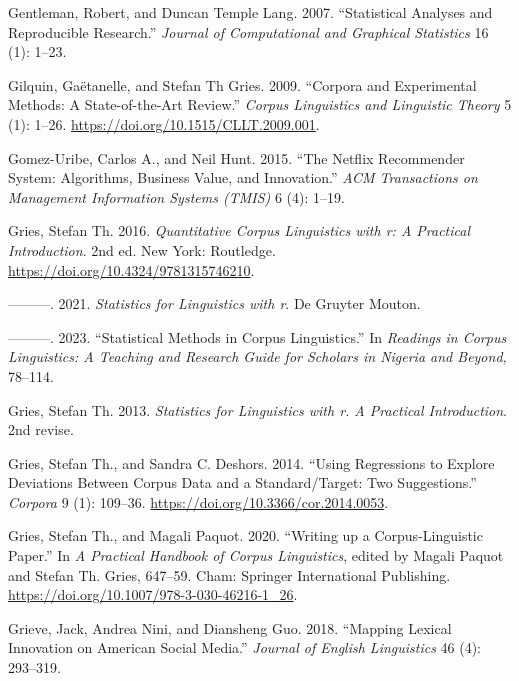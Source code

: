 \documentclass[
  letterpaper,
]{latex/krantz}
\newlength{\cslhangindent}
\newenvironment{CSLReferences}[2] %
 {\begin{list}{}{%
  \setlength{\itemindent}{0pt}
  \setlength{\leftmargin}{0pt}
  \setlength{\parsep}{0pt}
  \ifodd #1
   \setlength{\leftmargin}{\cslhangindent}
   \setlength{\itemindent}{-1\cslhangindent}
  \fi
  \setlength{\itemsep}{#2\baselineskip}}}
 {\end{list}}
\theoremstyle{definition}
\theoremstyle{remark}
\begin{document}
\begin{CSLReferences}{1}{0}
Gentleman, Robert, and Duncan Temple Lang. 2007. {``Statistical Analyses
and Reproducible Research.''} \emph{Journal of Computational and
Graphical Statistics} 16 (1): 1--23.

Gilquin, Gaëtanelle, and Stefan Th Gries. 2009. {``Corpora and
Experimental Methods: A State-of-the-Art Review.''} \emph{Corpus
Linguistics and Linguistic Theory} 5 (1): 1--26.
\url{https://doi.org/10.1515/CLLT.2009.001}.

Gomez-Uribe, Carlos A., and Neil Hunt. 2015. {``The Netflix Recommender
System: Algorithms, Business Value, and Innovation.''} \emph{ACM
Transactions on Management Information Systems (TMIS)} 6 (4): 1--19.

Gries, Stefan Th. 2016. \emph{Quantitative Corpus Linguistics with r: A
Practical Introduction}. 2nd ed. New York: Routledge.
\url{https://doi.org/10.4324/9781315746210}.

---------. 2021. \emph{Statistics for Linguistics with r}. De Gruyter
Mouton.

---------. 2023. {``Statistical Methods in Corpus Linguistics.''} In
\emph{Readings in Corpus Linguistics: A Teaching and Research Guide for
Scholars in Nigeria and Beyond,} 78--114.

Gries, Stefan Th. 2013. \emph{Statistics for Linguistics with r. A
Practical Introduction}. 2nd revise.

Gries, Stefan Th., and Sandra C. Deshors. 2014. {``Using Regressions to
Explore Deviations Between Corpus Data and a Standard/Target: Two
Suggestions.''} \emph{Corpora} 9 (1): 109--36.
\url{https://doi.org/10.3366/cor.2014.0053}.

Gries, Stefan Th., and Magali Paquot. 2020. {``Writing up a
Corpus-Linguistic Paper.''} In \emph{A Practical Handbook of Corpus
Linguistics}, edited by Magali Paquot and Stefan Th. Gries, 647--59.
Cham: Springer International Publishing.
\url{https://doi.org/10.1007/978-3-030-46216-1_26}.

Grieve, Jack, Andrea Nini, and Diansheng Guo. 2018. {``Mapping Lexical
Innovation on American Social Media.''} \emph{Journal of English
Linguistics} 46 (4): 293--319.


\end{CSLReferences}
\end{document}
